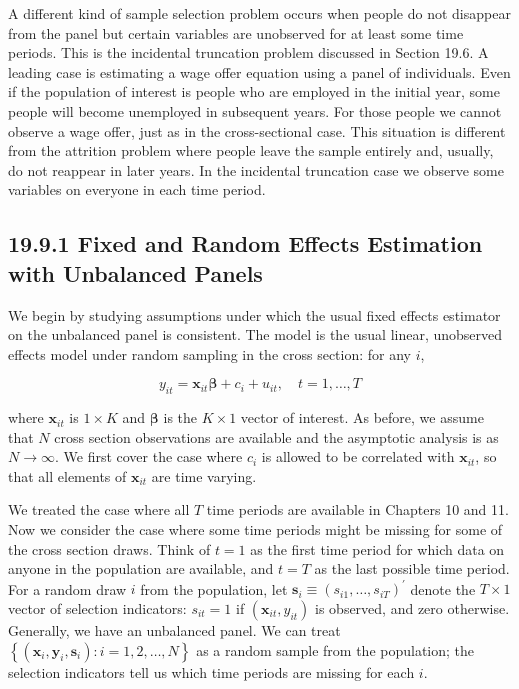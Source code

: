 \documentclass[10pt]{article}
\begin{document}
A different kind of sample selection problem occurs when people do not disappear from the panel but certain variables are unobserved for at least some time periods. This is the incidental truncation problem discussed in Section 19.6. A leading case is estimating a wage offer equation using a panel of individuals. Even if the population of interest is people who are employed in the initial year, some people will become unemployed in subsequent years. For those people we cannot observe a wage offer, just as in the cross-sectional case. This situation is different from the attrition problem where people leave the sample entirely and, usually, do not reappear in later years. In the incidental truncation case we observe some variables on everyone in each time period.

\subsection*{19.9.1 Fixed and Random Effects Estimation with Unbalanced Panels}
We begin by studying assumptions under which the usual fixed effects estimator on the unbalanced panel is consistent. The model is the usual linear, unobserved effects model under random sampling in the cross section: for any $i$,


\begin{equation*}
y_{i t}=\mathbf{x}_{i t} \boldsymbol{\beta}+c_{i}+u_{i t}, \quad t=1, \ldots, T \tag{19.95}
\end{equation*}


where $\mathbf{x}_{i t}$ is $1 \times K$ and $\boldsymbol{\beta}$ is the $K \times 1$ vector of interest. As before, we assume that $N$ cross section observations are available and the asymptotic analysis is as $N \rightarrow \infty$. We first cover the case where $c_{i}$ is allowed to be correlated with $\mathbf{x}_{i t}$, so that all elements of $\mathbf{x}_{i t}$ are time varying.

We treated the case where all $T$ time periods are available in Chapters 10 and 11. Now we consider the case where some time periods might be missing for some of the cross section draws. Think of $t=1$ as the first time period for which data on anyone in the population are available, and $t=T$ as the last possible time period. For a random draw $i$ from the population, let $\mathbf{s}_{i} \equiv\left(s_{i 1}, \ldots, s_{i T}\right)^{\prime}$ denote the $T \times 1$ vector of selection indicators: $s_{i t}=1$ if $\left(\mathbf{x}_{i t}, y_{i t}\right)$ is observed, and zero otherwise. Generally, we have an unbalanced panel. We can treat $\left\{\left(\mathbf{x}_{i}, \mathbf{y}_{i}, \mathbf{s}_{i}\right): i=1,2, \ldots, N\right\}$ as a random sample from the population; the selection indicators tell us which time periods are missing for each $i$.
\end{document}
